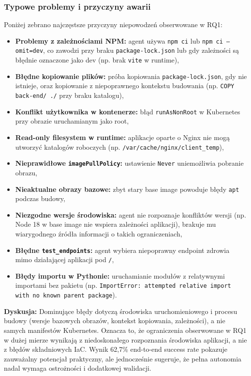 \subsubsection{Typowe problemy i przyczyny awarii}

Poniżej zebrano najczęstsze przyczyny niepowodzeń obserwowane w RQ1:

\begin{itemize}
    \item \textbf{Problemy z zależnościami NPM:} agent używa \texttt{npm ci} lub \texttt{npm ci --omit=dev}, co zawodzi przy braku \texttt{package-lock.json} lub gdy zależności są błędnie oznaczone jako dev (np. brak \texttt{vite} w runtime),
    \item \textbf{Błędne kopiowanie plików:} próba kopiowania \texttt{package-lock.json}, gdy nie istnieje, oraz kopiowanie z niepoprawnego kontekstu budowania (np. \texttt{COPY back-end/ ./} przy braku katalogu),
    \item \textbf{Konflikt użytkownika w kontenerze:} błąd \texttt{runAsNonRoot} w Kubernetes przy obrazie uruchamianym jako root,
    \item \textbf{Read-only filesystem w runtime:} aplikacje oparte o Nginx nie mogą utworzyć katalogów roboczych (np. \texttt{/var/cache/nginx/client\_temp}),
    \item \textbf{Nieprawidłowe \texttt{imagePullPolicy}:} ustawienie \texttt{Never} uniemożliwia pobranie obrazu,
    \item \textbf{Nieaktualne obrazy bazowe:} zbyt stary base image powoduje błędy \texttt{apt} podczas budowy,
    \item \textbf{Niezgodne wersje środowiska:} agent nie rozpoznaje konfliktów wersji (np. Node 18 w base image nie wspiera zależności aplikacji), brakuje mu wiarygodnego źródła informacji o takich ograniczeniach,
    \item \textbf{Błędne \texttt{test\_endpoints}:} agent wybiera niepoprawny endpoint zdrowia mimo działającej aplikacji pod \texttt{/},
    \item \textbf{Błędy importu w Pythonie:} uruchamianie modułów z relatywnymi importami bez pakietu (np. \texttt{ImportError: attempted relative import with no known parent package}).
\end{itemize}

\textbf{Dyskusja:} Dominujące błędy dotyczą środowiska uruchomieniowego i procesu budowy (wersje bazowych obrazów, kontekst kopiowania, zależności), a nie samych manifestów Kubernetes. Oznacza to, że ograniczenia obserwowane w RQ1 w dużej mierze wynikają z niedoskonałego rozpoznania środowiska aplikacji, a nie z błędów składniowych IaC. Wynik 62{,}7\% end-to-end success rate pokazuje zauważalny potencjał praktyczny, ale jednocześnie sugeruje, że pełna autonomia nadal wymaga ostrożności i dodatkowej walidacji.

